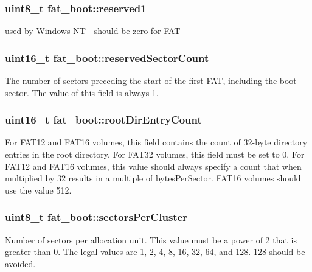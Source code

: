 \subsubsection[{\texorpdfstring{reserved1}{reserved1}}]{\setlength{\rightskip}{0pt plus 5cm}uint8\+\_\+t fat\+\_\+boot\+::reserved1}\hypertarget{structfat__boot_affa7e6efb3ccea19ba7ea0ddadce7463}{}\label{structfat__boot_affa7e6efb3ccea19ba7ea0ddadce7463}
used by Windows NT -\/ should be zero for F\+AT 
\subsubsection[{\texorpdfstring{reserved\+Sector\+Count}{reservedSectorCount}}]{\setlength{\rightskip}{0pt plus 5cm}uint16\+\_\+t fat\+\_\+boot\+::reserved\+Sector\+Count}\hypertarget{structfat__boot_a13f272a8f780fb43a400f873a3fd7b73}{}\label{structfat__boot_a13f272a8f780fb43a400f873a3fd7b73}
The number of sectors preceding the start of the first F\+AT, including the boot sector. The value of this field is always 1. 
\subsubsection[{\texorpdfstring{root\+Dir\+Entry\+Count}{rootDirEntryCount}}]{\setlength{\rightskip}{0pt plus 5cm}uint16\+\_\+t fat\+\_\+boot\+::root\+Dir\+Entry\+Count}\hypertarget{structfat__boot_a2124f89e12307df944f08e6657dbf4af}{}\label{structfat__boot_a2124f89e12307df944f08e6657dbf4af}
For F\+A\+T12 and F\+A\+T16 volumes, this field contains the count of 32-\/byte directory entries in the root directory. For F\+A\+T32 volumes, this field must be set to 0. For F\+A\+T12 and F\+A\+T16 volumes, this value should always specify a count that when multiplied by 32 results in a multiple of bytes\+Per\+Sector. F\+A\+T16 volumes should use the value 512. 
\subsubsection[{\texorpdfstring{sectors\+Per\+Cluster}{sectorsPerCluster}}]{\setlength{\rightskip}{0pt plus 5cm}uint8\+\_\+t fat\+\_\+boot\+::sectors\+Per\+Cluster}\hypertarget{structfat__boot_ab3063726125b16a2ccad719548d79abd}{}\label{structfat__boot_ab3063726125b16a2ccad719548d79abd}
Number of sectors per allocation unit. This value must be a power of 2 that is greater than 0. The legal values are 1, 2, 4, 8, 16, 32, 64, and 128. 128 should be avoided. 
